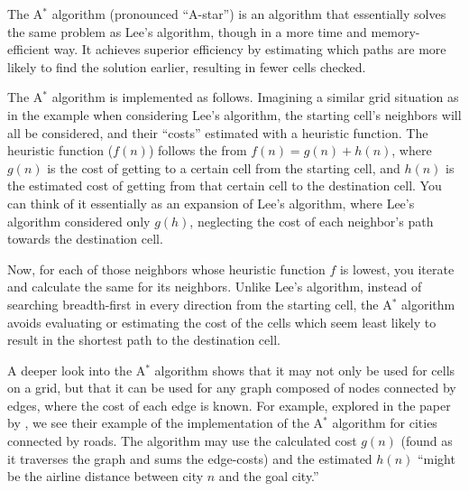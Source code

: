 
The A$^*$ algorithm (pronounced ``A-star'') is an algorithm
that essentially solves the same problem as Lee's algorithm,
though in a more time and memory-efficient way. It achieves
superior efficiency by estimating which paths are more
likely to find the solution earlier, resulting in fewer
cells checked.

The A$^*$ algorithm is implemented as follows. Imagining
a similar grid situation as in the example when considering
Lee's algorithm, the starting cell's neighbors will
all be considered, and their ``costs'' estimated with
a heuristic function. The heuristic function ($f(n)$)
follows the from $f(n) = g(n) + h(n)$, where $g(n)$
is the cost of getting to a certain cell from the starting
cell, and $h(n)$ is the estimated cost of getting from
that certain cell to the destination cell. You can think
of it essentially as an expansion of Lee's algorithm,
where Lee's algorithm considered only $g(h)$, neglecting
the cost of each neighbor's path towards the destination
cell.

Now, for each of those neighbors whose heuristic function
$f$ is lowest, you iterate and calculate the same for its
neighbors. Unlike Lee's algorithm, instead of searching
breadth-first in every direction from the starting cell,
the A$^*$ algorithm avoids evaluating or estimating the
cost of the cells which seem least likely to result in the
shortest path to the destination cell.

A deeper look into the A$^*$ algorithm shows that it may
not only be used for cells on a grid, but that it can
be used for any graph composed of nodes connected by
edges, where the cost of each edge is known. For example,
explored in the paper by \cite{4082128}, we see their
example of the implementation of the A$^*$ algorithm
for cities connected by roads. The algorithm may use
the calculated cost $g(n)$ (found as it traverses the graph
and sums the edge-costs) and the estimated $h(n)$ ``might
be the airline distance between city $n$ and the goal city.''
